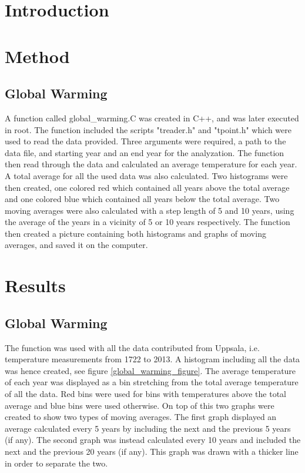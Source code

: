 \section{Introduction}



\section{Method}

\subsection{Global Warming}

A function called global\_warming.C was created in C++, and was later executed in root. The function included the scripts "treader.h" and "tpoint.h" which were used to read the data provided. Three arguments were required, a path to the data file, and starting year and an end year for the analyzation. The function then read through the data and calculated an average temperature for each year. A total average for all the used data was also calculated. Two histograms were then created, one colored red which contained all years above the total average and one colored blue which contained all years below the total average. Two moving averages were also calculated with a step length of 5 and 10 years, using the average of the years in a vicinity of 5 or 10 years respectively. The function then created a picture containing both histograms and graphs of moving averages, and saved it on the computer.

\section{Results}

\subsection{Global Warming}

The function was used with all the data contributed from Uppsala, i.e. temperature measurements from 1722 to 2013. A histogram including all the data was hence created,  see figure \ref{global_warming_figure}. The average temperature of each year was displayed as a bin stretching from the total average temperature of all the data. Red bins were used for bins with temperatures above the total average and blue bins were used otherwise. On top of this two graphs were created to show two types of moving averages. The first graph displayed an average calculated every 5 years by including the next and the previous 5 years (if any). The second graph was instead calculated every 10 years and included the next and the previous 20 years (if any). This graph was drawn with a thicker line in order to separate the two.

